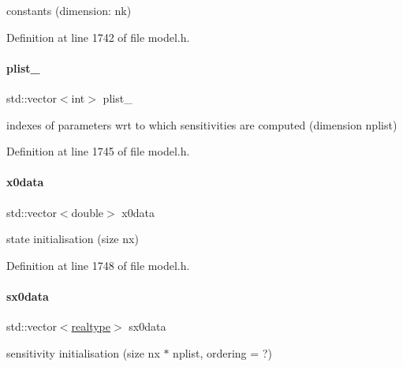 constants (dimension\+: nk) 

Definition at line 1742 of file model.\+h.

\mbox{\label{classamici_1_1_model_a67919df701b4afd60d13fc890432d9ec}} 
\paragraph{\texorpdfstring{plist\+\_\+}{plist\_}}
{\footnotesize\ttfamily std\+::vector$<$int$>$ plist\+\_\+\hspace{0.3cm}{\ttfamily [protected]}}

indexes of parameters wrt to which sensitivities are computed (dimension nplist) 

Definition at line 1745 of file model.\+h.

\mbox{\label{classamici_1_1_model_ac305126c59aab952182f851679df24f9}} 
\paragraph{\texorpdfstring{x0data}{x0data}}
{\footnotesize\ttfamily std\+::vector$<$double$>$ x0data\hspace{0.3cm}{\ttfamily [protected]}}

state initialisation (size nx) 

Definition at line 1748 of file model.\+h.

\mbox{\label{classamici_1_1_model_a7ebdaf00a4177be525b45a39edf1865c}} 
\paragraph{\texorpdfstring{sx0data}{sx0data}}
{\footnotesize\ttfamily std\+::vector$<$\mbox{\hyperlink{namespaceamici_a1bdce28051d6a53868f7ccbf5f2c14a3}{realtype}}$>$ sx0data\hspace{0.3cm}{\ttfamily [protected]}}

sensitivity initialisation (size nx $\ast$ nplist, ordering = ?) 

